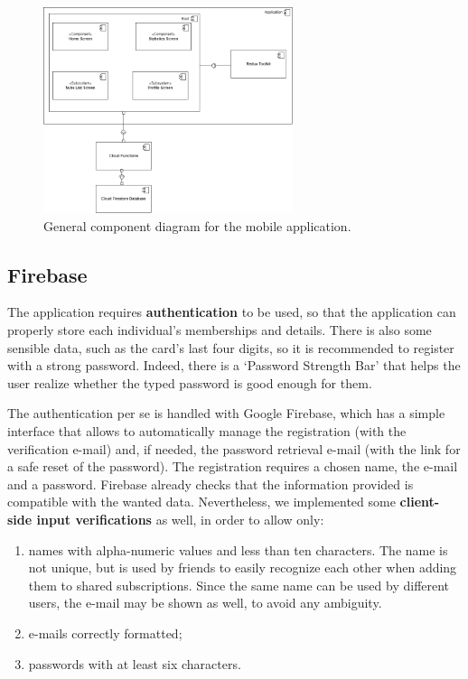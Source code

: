 \documentclass[12pt]{article}
\begin{document}
\begin{figure}[h!]
    \begin{center}
        \includegraphics[width=0.65\textwidth, clip]{../../assets/generalComponent.drawio.png}
    \end{center}
    \caption{General component diagram for the mobile application.}
    \label{fig:componentGen}
\end{figure}
\vspace{0.5cm}

\subsection{Firebase}
The application requires \textbf{authentication} to be used, so that the application can properly store each individual's memberships and details. There is also some sensible data, such as the card's last four digits, so it is recommended to register with a strong password. Indeed, there is a `Password Strength Bar' that helps the user realize whether the typed password is good enough for them.

The authentication per se is handled with Google Firebase, which has a simple interface that allows to automatically manage the registration (with the verification e-mail) and, if needed, the password retrieval e-mail (with the link for a safe reset of the password). The registration requires a chosen name, the e-mail and a password. Firebase already checks that the information provided is compatible with the wanted data. Nevertheless, we implemented some \textbf{client-side input verifications} as well, in order to allow only:
\begin{enumerate}
    \item names with alpha-numeric values and less than ten characters. The name is not unique, but is used by friends to easily recognize each other when adding them to shared subscriptions. Since the same name can be used by different users, the e-mail may be shown as well, to avoid any ambiguity.
    \item e-mails correctly formatted;
    \item passwords with at least six characters.
\end{enumerate}
\end{document}
